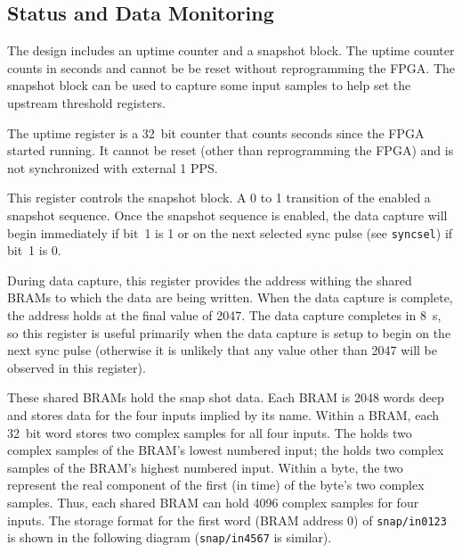 \documentclass[12pt]{article}
\begin{document}
\subsection{Status and Data Monitoring}

The design includes an uptime counter and a snapshot block.  The uptime counter
counts in seconds and cannot be be reset without reprogramming the FPGA.  The
snapshot block can be used to capture some input samples to help set the
upstream threshold registers.

\begin{description}

 The uptime register is a 32~bit counter that counts seconds
since the FPGA started running.  It cannot be reset (other than reprogramming
the FPGA) and is not synchronized with external 1 PPS.

 This register controls the snapshot block.  A 0 to 1
transition of the \LSb enabled a snapshot sequence.  Once the snapshot
sequence is enabled, the data capture will begin immediately if bit~1 is 1 or
on the next selected sync pulse (see \verb|syncsel|) if bit~1 is 0.

 During data capture, this register provides the address
withing the shared BRAMs to which the data are being written.  When the data
capture is complete, the address holds at the final value of 2047.  The data
capture completes in 8~\textmu s, so this register is useful primarily when the
data capture is setup to begin on the next sync pulse (otherwise it is unlikely
that any value other than 2047 will be observed in this register).

 These shared BRAMs hold the snap shot data.  Each BRAM is
2048 words deep and stores data for the four inputs implied by its name.
Within a BRAM, each 32~bit word stores two complex samples for all four inputs.
The \MSB holds two complex samples of the BRAM's lowest numbered input; the
\LSB holds two complex samples of the BRAM's highest numbered input.  Within a
byte, the two \MSbs represent the real component of the first (in time) of the
byte's two complex samples.  Thus, each shared BRAM can hold 4096 complex
samples for four inputs.  The storage format for the first word (BRAM address
0) of \verb|snap/in0123| is shown in the following diagram (\verb|snap/in4567|
is similar).\\


\end{description}
\end{document}
